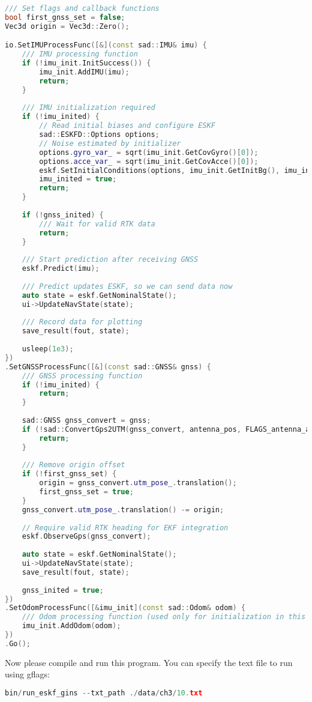 \begin{lstlisting}[language=c++,caption=src/ch4/run\_eskf\_gins.cc]
/// Set flags and callback functions
bool first_gnss_set = false;
Vec3d origin = Vec3d::Zero();

io.SetIMUProcessFunc([&](const sad::IMU& imu) {
	/// IMU processing function
	if (!imu_init.InitSuccess()) {
		imu_init.AddIMU(imu);
		return;
	}
	
	/// IMU initialization required
	if (!imu_inited) {
		// Read initial biases and configure ESKF
		sad::ESKFD::Options options;
		// Noise estimated by initializer
		options.gyro_var_ = sqrt(imu_init.GetCovGyro()[0]);
		options.acce_var_ = sqrt(imu_init.GetCovAcce()[0]);
		eskf.SetInitialConditions(options, imu_init.GetInitBg(), imu_init.GetInitBa(), imu_init.GetGravity());
		imu_inited = true;
		return;
	}
	
	if (!gnss_inited) {
		/// Wait for valid RTK data
		return;
	}
	
	/// Start prediction after receiving GNSS
	eskf.Predict(imu);
	
	/// Predict updates ESKF, so we can send data now
	auto state = eskf.GetNominalState();
	ui->UpdateNavState(state);
	
	/// Record data for plotting
	save_result(fout, state);
	
	usleep(1e3);
})
.SetGNSSProcessFunc([&](const sad::GNSS& gnss) {
	/// GNSS processing function
	if (!imu_inited) {
		return;
	}
	
	sad::GNSS gnss_convert = gnss;
	if (!sad::ConvertGps2UTM(gnss_convert, antenna_pos, FLAGS_antenna_angle) || !gnss_convert.heading_valid_) {
		return;
	}
	
	/// Remove origin offset
	if (!first_gnss_set) {
		origin = gnss_convert.utm_pose_.translation();
		first_gnss_set = true;
	}
	gnss_convert.utm_pose_.translation() -= origin;
	
	// Require valid RTK heading for EKF integration
	eskf.ObserveGps(gnss_convert);
	
	auto state = eskf.GetNominalState();
	ui->UpdateNavState(state);
	save_result(fout, state);
	
	gnss_inited = true;
})
.SetOdomProcessFunc([&imu_init](const sad::Odom& odom) {
	/// Odom processing function (used only for initialization in this chapter)
	imu_init.AddOdom(odom);
})
.Go();
\end{lstlisting}
Now please compile and run this program. You can specify the text file to run using gflags:
\begin{lstlisting}[language=c++,caption=Terminal input:]
bin/run_eskf_gins --txt_path ./data/ch3/10.txt 
\end{lstlisting}

